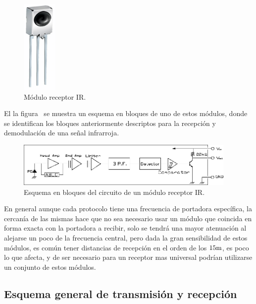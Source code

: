 \begin{figure}[H]
	\centering
	\includegraphics[width=0.15\textwidth]{img/IR/IRM86XX.png}
	\caption{\footnotesize{Módulo receptor IR.}}
	\label{fig:IR_Module}
\end{figure}



El la figura~ se muestra un esquema en bloques de uno de estos módulos, donde se identifican los bloques anteriormente descriptos para la recepción y demodulación de una señal infrarroja.


\begin{figure}[H]
	\centering
	\includegraphics[width=0.95\textwidth]{img/IR/IR_module_blocks.png}
	\caption{\footnotesize{Esquema en bloques del circuito de un módulo receptor IR.}}
	\label{fig:IR_Module_sch}
\end{figure}


En general aunque cada protocolo tiene una frecuencia de portadora específica, la cercanía de las mismas hace que no sea necesario usar un módulo que coincida en forma exacta con la portadora a recibir, solo se tendrá una mayor atenuación al alejarse un poco de la frecuencia central, pero dada la gran sensibilidad de estos módulos, es común tener distancias de recepción en el orden de los $15 \si[per-mode=symbol]{\meter}$, es poco lo que afecta, y de ser necesario para un receptor mas universal podrían utilizarse un conjunto de estos módulos.



\subsection{Esquema general de transmisión y recepción}

